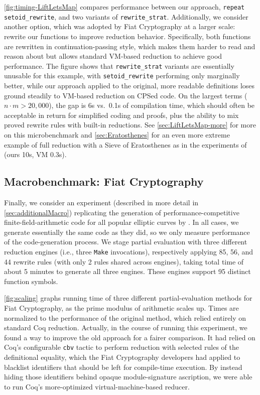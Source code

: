 \autoref{fig:timing-LiftLetsMap} compares performance between our approach, \texttt{repeat setoid\_rewrite}, and two variants of \texttt{rewrite\_strat}.
Additionally, we consider another option, which was adopted by Fiat Cryptography at a larger scale: rewrite our functions to improve reduction behavior.
Specifically, both functions are rewritten in continuation-passing style, which makes them harder to read and reason about but allows standard VM-based reduction to achieve good performance.
The figure shows that \texttt{rewrite\_strat} variants are essentially unusable for this example, with \texttt{setoid\_rewrite} performing only marginally better, while our approach applied to the original, more readable definitions loses ground steadily to VM-based reduction on CPSed code.
On the largest terms ($n \cdot m > 20,000$), the gap is 6s vs.\ 0.1s of compilation time, which should often be acceptable in return for simplified coding and proofs, plus the ability to mix proved rewrite rules with built-in reductions.
See \autoref{sec:LiftLetsMap-more} for more on this microbenchmark and \autoref{sec:Eratosthenes} for an even more extreme example of full reduction with a Sieve of Eratosthenes as in the experiments of \textcite{Aehlig} (ours 10s, VM 0.3s).

\subsection{Macrobenchmark: Fiat Cryptography} \label{sec:macro}

Finally, we consider an experiment (described in more detail in \autoref{sec:additionalMacro}) replicating the generation of performance-competitive finite-field-arithmetic code for all popular elliptic curves by \textcite{FiatCryptoSP19}.
In all cases, we generate essentially the same code as they did, so we only measure performance of the code-generation process.
We stage partial evaluation with three different reduction engines (i.e., three \texttt{Make} invocations), respectively applying 85, 56, and 44 rewrite rules (with only 2 rules shared across engines), taking total time of about 5 minutes to generate all three engines.
These engines support 95 distinct function symbols.

\autoref{fig:scaling} graphs running time of three different partial-evaluation methods for Fiat Cryptography, as the prime modulus of arithmetic scales up.
Times are normalized to the performance of the original method, which relied entirely on standard Coq reduction.
Actually, in the course of running this experiment, we found a way to improve the old approach for a fairer comparison.
It had relied on Coq's configurable \texttt{cbv} tactic to perform reduction with selected rules of the definitional equality, which the Fiat Cryptography developers had applied to blacklist identifiers that should be left for compile-time execution.
By instead hiding those identifiers behind opaque module-signature ascription, we were able to run Coq's more-optimized virtual-machine-based reducer.

